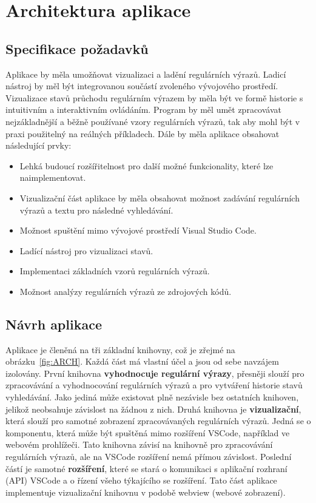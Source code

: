 \chapter{Architektura aplikace}\label{sec:ApplicationTechnology}

\section{Specifikace požadavků}

Aplikace by měla umožňovat vizualizaci a ladění regulárních výrazů.
Ladicí nástroj by měl být integrovanou součástí zvoleného vývojového prostředí.
Vizualizace stavů průchodu regulárním výrazem by měla být ve formě historie s intuitivním a interaktivním ovládáním.
Program by měl umět zpracovávat nejzákladnější a běžně používané vzory regulárních výrazů, tak aby mohl být v praxi použitelný na reálných příkladech.
Dále by měla aplikace obsahovat následující prvky:
\begin{itemize}
	\item Lehká budoucí rozšířitelnost pro další možné funkcionality, které lze naimplementovat.
	\item Vizualizační část aplikace by měla obsahovat možnost zadávání regulárních výrazů a textu pro následné vyhledávání.
	\item Možnost spuštění mimo vývojové prostředí Visual Studio Code.
	\item Ladící nástroj pro vizualizaci stavů.
	\item Implementaci základních vzorů regulárních výrazů.
	\item Možnost analýzy regulárních výrazů ze zdrojových kódů.
\end{itemize}

\section{Návrh aplikace}

Aplikace je členěná na tři základní knihovny, což je zřejmé na obrázku~\ref{fig:ARCH}.
Každá část má vlastní účel a jsou od sebe navzájem izolovány.
První knihovna \textbf{vyhodnocuje regulární výrazy}, přesněji slouží pro zpracovávání a vyhodnocování regulárních výrazů a pro vytváření historie stavů vyhledávání.
Jako jediná může existovat plně nezávisle bez ostatních knihoven, jelikož neobsahuje závislost na žádnou z nich.
Druhá knihovna je \textbf{vizualizační}, která slouží pro samotné zobrazení zpracovávaných regulárních výrazů.
Jedná se o komponentu, která může být spuštěná mimo rozšíření VSCode, například ve webovém prohlížeči.
Tato knihovna závisí na knihovně pro zpracovávání regulárních výrazů, ale na VSCode rozšíření nemá přímou závislost.
Poslední částí je samotné \textbf{rozšíření}, které se stará o komunikaci s aplikační rozhraní (API) VSCode a o řízení všeho týkajícího se rozšíření.
Tato část aplikace implementuje vizualizační knihovnu v podobě webview (webové zobrazení).

